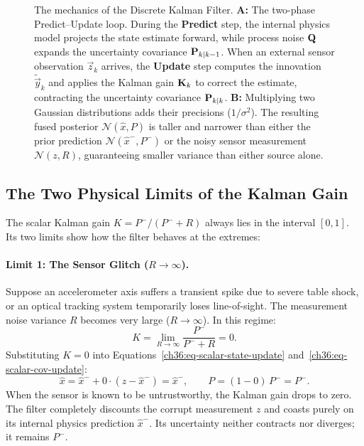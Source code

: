 \begin{figure}[H]
\caption{The mechanics of the Discrete Kalman Filter. \textbf{A:} The two-phase Predict--Update loop. During the \textbf{Predict} step, the internal physics model projects the state estimate forward, while process noise $\mathbf{Q}$ expands the uncertainty covariance $\mathbf{P}_{k\mid k-1}$. When an external sensor observation $\vec{z}_k$ arrives, the \textbf{Update} step computes the innovation $\tilde{\vec{y}}_k$ and applies the Kalman gain $\mathbf{K}_k$ to correct the estimate, contracting the uncertainty covariance $\mathbf{P}_{k\mid k}$. \textbf{B:} Multiplying two Gaussian distributions adds their precisions ($1/\sigma^2$). The resulting fused posterior $\mathcal{N}(\hat{x}, P)$ is taller and narrower than either the prior prediction $\mathcal{N}(\hat{x}^-, P^-)$ or the noisy sensor measurement $\mathcal{N}(z, R)$, guaranteeing smaller variance than either source alone.}
\label{ch36:fig-kalman-loop}
\end{figure}

\subsection{The Two Physical Limits of the Kalman Gain}
\label{ch36:kalman-limits}

The scalar Kalman gain $K = P^- / (P^- + R)$ always lies in the interval $[0, 1]$. Its two limits show how the filter behaves at the extremes:

\paragraph{Limit 1: The Sensor Glitch ($R \to \infty$).}
Suppose an accelerometer axis suffers a transient spike due to severe table shock, or an optical tracking system temporarily loses line-of-sight. The measurement noise variance $R$ becomes very large ($R \to \infty$). In this regime:
\begin{equation}
  K = \lim_{R \to \infty} \frac{P^-}{P^- + R} = 0 .
\end{equation}
Substituting $K = 0$ into Equations~\eqref{ch36:eq-scalar-state-update} and~\eqref{ch36:eq-scalar-cov-update}:
\begin{equation}
  \hat{x} = \hat{x}^- + 0 \cdot (z - \hat{x}^-) = \hat{x}^- , \qquad P = (1 - 0)\, P^- = P^- .
\end{equation}
When the sensor is known to be untrustworthy, the Kalman gain drops to zero. The filter completely discounts the corrupt measurement $z$ and coasts purely on its internal physics prediction $\hat{x}^-$. Its uncertainty neither contracts nor diverges; it remains $P^-$.

